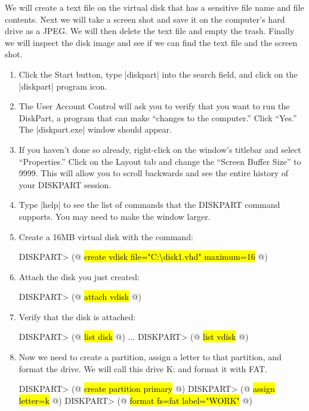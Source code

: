 We will create a text file on the virtual disk that has a sensitive file
name and file contents. Next we will take a screen shot and save it on
the computer's hard drive as a JPEG. We will then delete the text file
and empty the trash. Finally we will inspect the disk image and see if
we can find the text file and the screen shot.


\begin{enumerate}


\item Click the Start button, type |diskpart| into the search field,
and click on the |diskpart| program icon.
\item The User Account Control will ask you to verify that you want to
run the DiskPart, a program that can make ``changes to the computer.''
Click ``Yes.''  The |diskpart.exe| window should appear.
\item If you haven't done so already, right-click on the window's
titlebar and select ``Properties.'' Click on the Layout tab and change
the ``Screen Buffer Size'' to 9999. This will allow you to scroll
backwards and see the entire history of your DISKPART session.
\item Type |help| to see the list of commands that the DISKPART
command supports. You may need to make the window larger.

\item Create a 16MB virtual disk with the command:

\begin{code}
DISKPART> (@ \hl{create vdisk file="C:\textbackslash{}disk1.vhd" maximum=16} @)
\end{code}

\item Attach the disk you just created:
\begin{code}
DISKPART> (@ \hl{attach vdisk} @)
\end{code}

\item Verify that the disk is attached:
\begin{code}
DISKPART> (@ \hl{list disk} @)
...
DISKPART> (@ \hl{list vdisk} @)
\end{code}

\item Now we need to create a partition, assign a letter to that
partition, and format the drive. We will call this drive K: and format
it with FAT. 
\begin{code}
DISKPART> (@ \hl{create partition primary} @)
DISKPART> (@ \hl{assign letter=k} @)
DISKPART> (@ \hl{format fs=fat label="WORK"} @)
\end{code}
\end{enumerate}

